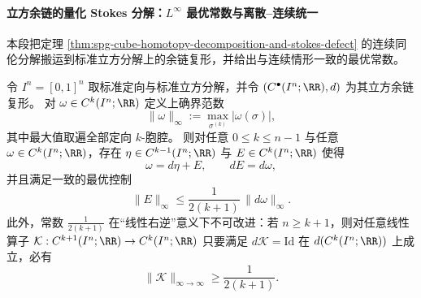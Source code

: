\paragraph{立方余链的量化 Stokes 分解：\texorpdfstring{$L^\infty$}{L-infty} 最优常数与离散--连续统一}
本段把定理 \ref{thm:spg-cube-homotopy-decomposition-and-stokes-defect} 的连续同伦分解搬运到标准立方分解上的余链复形，并给出与连续情形一致的最优常数。

\begin{theorem}\label{thm:spg-cubical-quantized-stokes-poincare-linf-optimal}
令 \(I^n=[0,1]^n\) 取标准定向与标准立方分解，并令 \((C^\bullet(I^n;\RR),d)\) 为其立方余链复形。
对 \(\omega\in C^k(I^n;\RR)\) 定义上确界范数
\[
\|\omega\|_\infty:=\max_{\sigma^{(k)}}|\omega(\sigma)|,
\]
其中最大值取遍全部定向 \(k\)-胞腔。
则对任意 \(0\le k\le n-1\) 与任意 \(\omega\in C^k(I^n;\RR)\)，存在
\(\eta\in C^{k-1}(I^n;\RR)\) 与 \(E\in C^{k}(I^n;\RR)\) 使得
\begin{equation}\label{eq:spg-cubical-stokes-decomposition}
\omega=d\eta+E,\qquad dE=d\omega,
\end{equation}
并且满足一致的最优控制
\begin{equation}\label{eq:spg-cubical-stokes-defect-optimal-constant}
\|E\|_\infty\le \frac{1}{2(k+1)}\,\|d\omega\|_\infty.
\end{equation}
此外，常数 \(\frac{1}{2(k+1)}\) 在“线性右逆”意义下不可改进：若 \(n\ge k+1\)，则对任意线性算子
\(\mathcal K:C^{k+1}(I^n;\RR)\to C^{k}(I^n;\RR)\)
只要满足 \(d\mathcal K=\mathrm{Id}\) 在 \(d(C^{k}(I^n;\RR))\) 上成立，必有
\[
\|\mathcal K\|_{\infty\to\infty}\ge \frac{1}{2(k+1)}.
\]
\end{theorem}
